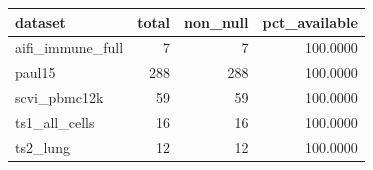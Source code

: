 \begin{tabular}{lrrr}
\toprule
dataset & total & non\_null & pct\_available \\
\midrule
aifi\_immune\_full & 7 & 7 & 100.0000 \\
paul15 & 288 & 288 & 100.0000 \\
scvi\_pbmc12k & 59 & 59 & 100.0000 \\
ts1\_all\_cells & 16 & 16 & 100.0000 \\
ts2\_lung & 12 & 12 & 100.0000 \\
\bottomrule
\end{tabular}
